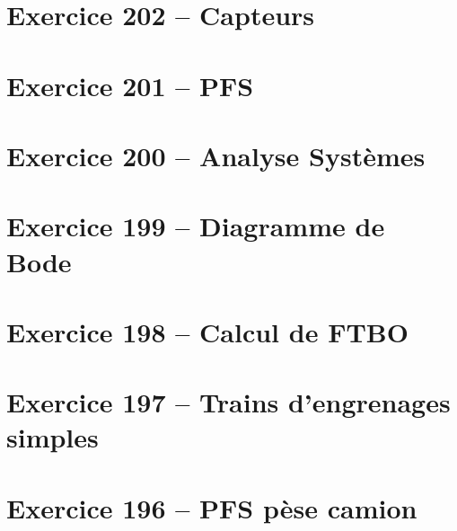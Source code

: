 \documentclass[10pt,fleqn]{article} %
\begin{document}
\begin{multicols}{2}
\section*{Exercice 202 -- Capteurs}
\renewcommand{\repex}{010_Capteurs}
\graphicspath{{\repex/images/}}


\section*{Exercice 201 -- PFS}
\renewcommand{\repex}{016_PFS}
\graphicspath{{\repex/images/}}


\section*{Exercice 200 -- Analyse Systèmes}
\renewcommand{\repex}{011_IS}
\graphicspath{{\repex/images/}}


\section*{Exercice 199 -- Diagramme de Bode}
\renewcommand{\repex}{012_Bode}
\graphicspath{{\repex/images/}}


\section*{Exercice 198 -- Calcul de FTBO}
\renewcommand{\repex}{013_FTBO}
\graphicspath{{\repex/images/}}


\section*{Exercice 197 -- Trains d'engrenages simples}
\renewcommand{\repex}{018_TrainSimples}
\graphicspath{{\repex/images/}}


\section*{Exercice 196 -- PFS pèse camion}
\renewcommand{\repex}{019_PFS_PeseCamion}
\graphicspath{{\repex/images/}}









\end{multicols}
\end{document}
